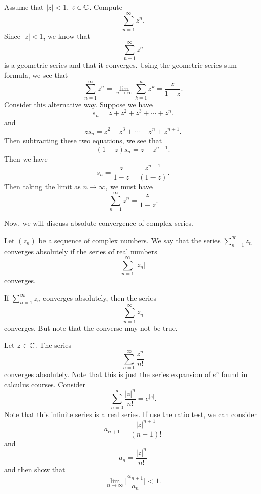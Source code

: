 \documentclass[a4paper]{report}
\begin{document}
\begin{eg}
    Assume that \( | z  |  < 1  \), \( z \in \mathbb{C}  \). Compute
    \[  \sum_{ n=1  }^{ \infty   } z^{n}. \]
    Since \( | z  |  < 1  \), we know that 
    \[  \sum_{ n-1  }^{ \infty  } z^{n}   \]
    is a geometric series and that it converges. Using the geometric series sum formula, we see that
    \[  \sum_{ n=1  }^{ \infty  } z^{n} = \lim_{ n \to \infty  }  \sum_{  k =1  }^{ n  } z^{k } = \frac{ z  }{  1 - z }.  \]
    Consider this alternative way. Suppose we have
    \[ {s}_{n} = z + z^{2} + z^{3} + \cdots + z^{n}.    \]
    and
    \[  z {s}_{n} =  z^{2} + z^{3} + \cdots + z^{n} + z^{n+1}.  \]
    Then subtracting these two equations, we see that
    \[  (1 - z ) {s}_{n} = z - z^{n+1}. \]
    Then we have
    \[  {s}_{n} = \frac{ z  }{ 1 - z  } - \frac{ z^{n+1} }{ (1 - z) }.  \]
    Then taking the limit as \( n \to \infty  \), we must have
    \[  \sum_{ n=1  }^{ \infty   } z^{n} = \frac{ z  }{  1 - z  }. \]
\end{eg}

Now, we will discuss absolute convergence of complex series.

\begin{definition}
    Let \( ({z}_{n}) \) be a sequence of complex numbers. We say that the series \( \sum_{  n = 1  }^{  \infty  } {z}_{n} \) converges absolutely if the series of real numbers 
    \[  \sum_{ n=1  }^{ \infty   } | {z}_{n} |  \] converges.
\end{definition}


\begin{remark}
    If \( \sum_{ n=1  }^{ \infty  } {z}_{n} \) converges absolutely, then the series
    \[  \sum_{ n=1  }^{ \infty  } {z}_{n} \] converges.
    But note that the converse may not be true.
\end{remark}

\begin{eg}
Let \( z \in \mathbb{C}  \). The series  
\[  \sum_{ n=0  }^{ \infty  } \frac{ z^{n} }{ n!  }   \]
converges absolutely. Note that this is just the series expansion of \( e^{z} \) found in calculus courses. Consider   
\[  \sum_{ n=0  }^{ \infty  } \frac{ | z |^{n} }{ n!  }  = e^{| z | }.  \]
Note that this infinite series is a real series. If use the ratio test, we can consider 
\[  {a}_{n+1} = \frac{ | z |^{n+1} }{ (n+1)! }  \]
and 
\[  {a}_{n} = \frac{ | z |^{n} }{ n!  }  \]
and then show that 
\[  \lim_{ n \to \infty  }  \Big| \frac{ {a}_{n+1} }{ {a}_{n} }  \Big|  < 1.  \]
\end{eg}
\end{document}
